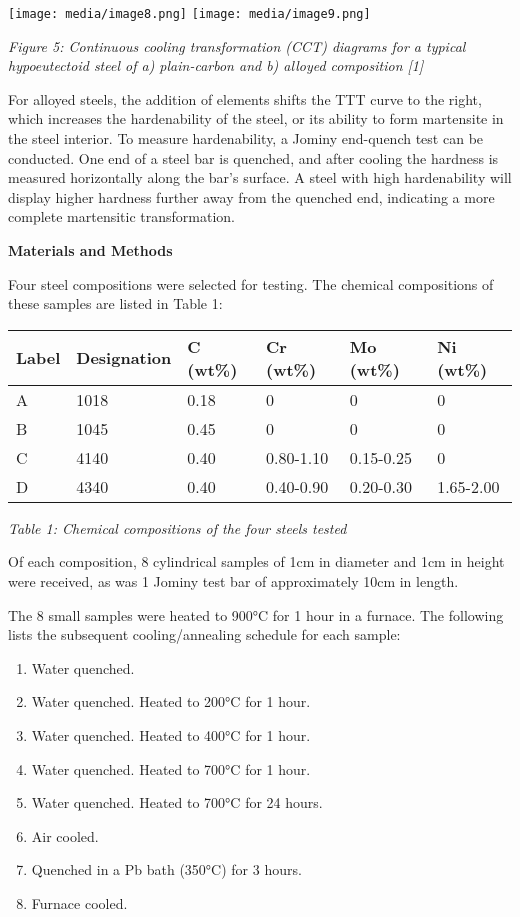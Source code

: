 \documentclass[]{article}
\begin{document}
\texttt{[image: media/image8.png]}
\texttt{[image: media/image9.png]}

\emph{Figure 5: Continuous cooling transformation (CCT) diagrams for a
typical hypoeutectoid steel of a) plain-carbon and b) alloyed
composition {[}1{]}}

For alloyed steels, the addition of elements shifts the TTT curve to the
right, which increases the hardenability of the steel, or its ability to
form martensite in the steel interior. To measure hardenability, a
Jominy end-quench test can be conducted. One end of a steel bar is
quenched, and after cooling the hardness is measured horizontally along
the bar's surface. A steel with high hardenability will display higher
hardness further away from the quenched end, indicating a more complete
martensitic transformation.

\textbf{Materials and Methods}

Four steel compositions were selected for testing. The chemical
compositions of these samples are listed in Table 1:

\begin{longtable}[]{@{}llllll@{}}
\toprule
\textbf{Label} & \textbf{Designation} & \textbf{C (wt\%)} & \textbf{Cr
(wt\%)} & \textbf{Mo (wt\%)} & \textbf{Ni (wt\%)}\tabularnewline
\midrule
\endhead
A & 1018 & 0.18 & 0 & 0 & 0\tabularnewline
B & 1045 & 0.45 & 0 & 0 & 0\tabularnewline
C & 4140 & 0.40 & 0.80-1.10 & 0.15-0.25 & 0\tabularnewline
D & 4340 & 0.40 & 0.40-0.90 & 0.20-0.30 & 1.65-2.00\tabularnewline
\bottomrule
\end{longtable}

\emph{Table 1: Chemical compositions of the four steels tested}

Of each composition, 8 cylindrical samples of 1cm in diameter and 1cm in
height were received, as was 1 Jominy test bar of approximately 10cm in
length.

The 8 small samples were heated to 900°C for 1 hour in a furnace. The
following lists the subsequent cooling/annealing schedule for each
sample:

\begin{enumerate}
\def\labelenumi{\arabic{enumi}.}
\item
  Water quenched.
\item
  Water quenched. Heated to 200°C for 1 hour.
\item
  Water quenched. Heated to 400°C for 1 hour.
\item
  Water quenched. Heated to 700°C for 1 hour.
\item
  Water quenched. Heated to 700°C for 24 hours.
\item
  Air cooled.
\item
  Quenched in a Pb bath (350°C) for 3 hours.
\item
  Furnace cooled.
\end{enumerate}
\end{document}

